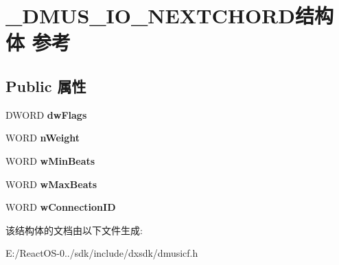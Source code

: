 \hypertarget{struct___d_m_u_s___i_o___n_e_x_t_c_h_o_r_d}{}\section{\+\_\+\+D\+M\+U\+S\+\_\+\+I\+O\+\_\+\+N\+E\+X\+T\+C\+H\+O\+R\+D结构体 参考}
\label{struct___d_m_u_s___i_o___n_e_x_t_c_h_o_r_d}
\subsection*{Public 属性}
\begin{DoxyCompactItemize}
\item 
\mbox{\label{struct___d_m_u_s___i_o___n_e_x_t_c_h_o_r_d_a67c5f638981aeab614c89da1d4631f4c}} 
D\+W\+O\+RD {\bfseries dw\+Flags}
\item 
\mbox{\label{struct___d_m_u_s___i_o___n_e_x_t_c_h_o_r_d_a03c98a64b85771b9159ed951db2e2f59}} 
W\+O\+RD {\bfseries n\+Weight}
\item 
\mbox{\label{struct___d_m_u_s___i_o___n_e_x_t_c_h_o_r_d_ac8c54c93414bf1191a58fe77cf588b8e}} 
W\+O\+RD {\bfseries w\+Min\+Beats}
\item 
\mbox{\label{struct___d_m_u_s___i_o___n_e_x_t_c_h_o_r_d_aab0ff5f25a949d0efac2687f9d46f7d1}} 
W\+O\+RD {\bfseries w\+Max\+Beats}
\item 
\mbox{\label{struct___d_m_u_s___i_o___n_e_x_t_c_h_o_r_d_a0635c9fe606c5e874b1ef18df65f7810}} 
W\+O\+RD {\bfseries w\+Connection\+ID}
\end{DoxyCompactItemize}


该结构体的文档由以下文件生成\+:\begin{DoxyCompactItemize}
\item 
E\+:/\+React\+O\+S-\/0../sdk/include/dxsdk/dmusicf.\+h\end{DoxyCompactItemize}
